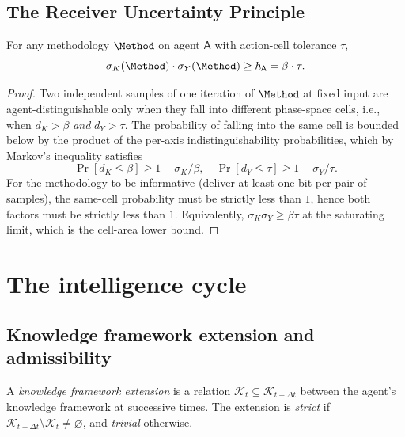 \documentclass[11pt,twocolumn,a4paper]{article}
\newcommand{\K}{\mathcal{K}}
\newcommand{\agent}{\mathsf{A}}
\newcommand{\hbarA}{\hbar_{\agent}}
\begin{document}
\subsection{The Receiver Uncertainty Principle}

\begin{theorem}\label{thm:uncertainty}
For any methodology $\Method$ on agent $\agent$ with action-cell tolerance $\tau$,
\[
\sigma_K(\Method) \cdot \sigma_Y(\Method) \ge \hbarA = \beta \cdot \tau.
\]
\end{theorem}

\begin{proof}
Two independent samples of one iteration of $\Method$ at fixed input are
agent-distinguishable only when they fall into different phase-space cells, i.e., when
$d_K > \beta$ \emph{and} $d_Y > \tau$. The probability of falling into the same cell is
bounded below by the product of the per-axis indistinguishability probabilities, which
by Markov's inequality satisfies
\[
\Pr[d_K \le \beta] \ge 1 - \sigma_K/\beta, \quad \Pr[d_Y \le \tau] \ge 1 - \sigma_Y/\tau.
\]
For the methodology to be informative (deliver at least one bit per pair of samples),
the same-cell probability must be strictly less than $1$, hence both factors must be
strictly less than $1$. Equivalently, $\sigma_K \sigma_Y \ge \beta \tau$ at the
saturating limit, which is the cell-area lower bound.
\end{proof}

\section{The intelligence cycle}
\label{sec:cycle}

\subsection{Knowledge framework extension and admissibility}

\begin{definition}\label{def:extension}
A \emph{knowledge framework extension} is a relation $\K_t \subseteq \K_{t+\Delta t}$
between the agent's knowledge framework at successive times. The extension is
\emph{strict} if $\K_{t+\Delta t} \setminus \K_t \neq \varnothing$, and \emph{trivial}
otherwise.
\end{definition}
\end{document}
